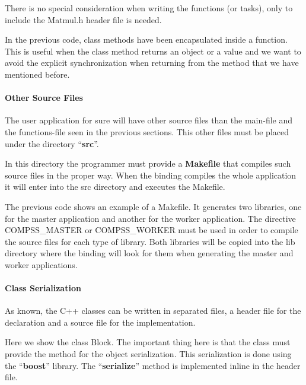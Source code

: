 There is no special consideration when writing the functions (or tasks), only to include the Matmul.h header file is needed.

In the previous code, class methods have been encapsulated inside a function. 
This is useful when the class method returns an object or a value and we want to avoid the explicit 
synchronization when returning from the method that we have mentioned before.

\paragraph{Other Source Files}
The user application for sure will have other source files than the main-file and the functions-file 
seen in the previous sections. This other files must be placed under the directory ``{\bf src}''.

In this directory the programmer must provide a {\bf Makefile} that compiles such source files in the proper way. 
When the binding compiles the whole application it will enter into the src directory and executes the Makefile.

The previous code shows an example of a Makefile. 
It generates two libraries, one for the master application and another for the worker application. 
The directive COMPSS\_MASTER or COMPSS\_WORKER must be used in order to compile the source files for each type of library. 
Both libraries will be copied into the lib directory where the binding will look for them when generating the master and worker applications.

\paragraph{Class Serialization}
As known, the C++ classes can be written in separated files, a header file for the declaration and a source file for the implementation.

Here we show the class Block. The important thing here is that the class must provide the method for the object serialization. 
This serialization is done using the ``{\bf boost}'' library. The ``{\bf serialize}'' method is implemented inline in the header file.

